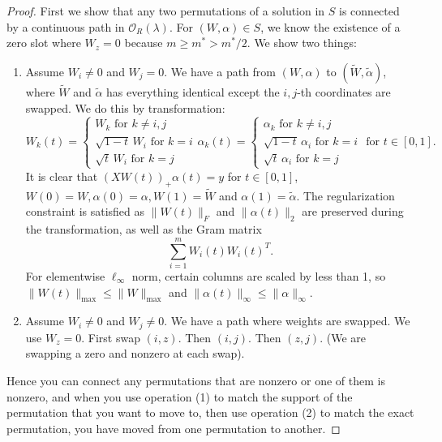 \documentclass{article}
\begin{document}
\begin{proof}
First we show that any two permutations of a solution in $S$ is connected by a continuous path in $\mathcal{O}_R(\lambda)$. For $(W, \alpha) \in S$, we know the existence of a zero slot where $W_z = 0$ because $m \geq m^{*} > m^{*}/2$. We show two things:
\begin{enumerate}
    \item Assume $W_i \ne 0$ and $W_j = 0$. We have a path from $(W, \alpha)$ to $(\tilde{W}, \tilde{\alpha})$, where $\tilde{W}$ and $\tilde{\alpha}$ has everything identical except the $i, j$-th coordinates are swapped. We do this by transformation:
    \[ 
    W_k(t) = \begin{cases} 
    W_k \text{ for } k \ne i, j \\[4pt] 
    \sqrt{1-t}\, W_i \text{ for } k = i \\[4pt] 
    \sqrt{t}\, W_i \text{ for } k = j \end{cases} 
    \alpha_k(t) = \begin{cases} \alpha_k \text{ for } k \ne i, j \\[4pt]
    \sqrt{1-t}\, \alpha_i \text{ for } k = i \\[4pt] 
    \sqrt{t}\, \alpha_i \text{ for } k = j \end{cases} \text{ for } t \in [0, 1].
    \]
    It is clear that $(XW(t))_+ \alpha(t) = y$ for $t \in [0, 1]$, $W(0)=W, \alpha(0)=\alpha, W(1)=\tilde{W}$ and $\alpha(1)=\tilde{\alpha}$. The regularization constraint is satisfied as $\|W(t)\|_F$ and $\|\alpha(t)\|_2$ are preserved during the transformation, as well as the Gram matrix
    \[
    \sum_{i=1}^{m} W_i(t) W_i(t)^{T}.
    \]
    For elementwise $\ell_\infty$ norm, certain columns are scaled by less than 1, so $\|W(t)\|_{\max} \le \|W\|_{\max}$ and $\|\alpha(t)\|_\infty \le \|\alpha\|_\infty$.
    \item Assume $W_i \ne 0$ and $W_j \ne 0$. We have a path where weights are swapped. We use $W_z = 0$. First swap $(i, z)$. Then $(i, j)$. Then $(z, j)$. (We are swapping a zero and nonzero at each swap).
\end{enumerate}
Hence you can connect any permutations that are nonzero or one of them is nonzero, and when you use operation (1) to match the support of the permutation that you want to move to, then use operation (2) to match the exact permutation, you have moved from one permutation to another.


\end{proof}
\end{document}
